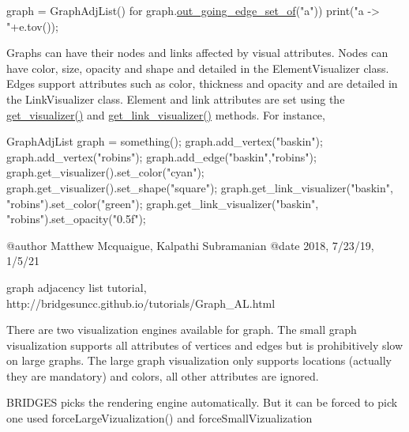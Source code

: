 \begin{DoxyCode}
graph = GraphAdjList()
for graph.\hyperlink{classbridges_1_1graph__adj__list_1_1_graph_adj_list_a6e14580e5fd7712bc8510da921fb97f6}{out\_going\_edge\_set\_of}("a"))
     print("a -> "+e.tov());
\end{DoxyCode}


Graphs can have their nodes and links affected by visual attributes. Nodes can have color, size, opacity and shape and detailed in the Element\+Visualizer class. Edges support attributes such as color, thickness and opacity and are detailed in the Link\+Visualizer class. Element and link attributes are set using the \hyperlink{classbridges_1_1graph__adj__list_1_1_graph_adj_list_ad63fce416ec0fdfd99d05e6236807fd8}{get\+\_\+visualizer()} and \hyperlink{classbridges_1_1graph__adj__list_1_1_graph_adj_list_abaa3015ae78e0f5ebc6fd2d2d2772927}{get\+\_\+link\+\_\+visualizer()} methods. For instance,


\begin{DoxyCode}
GraphAdjList graph = something();
graph.add\_vertex(\textcolor{stringliteral}{"baskin"});
graph.add\_vertex(\textcolor{stringliteral}{"robins"});
graph.add\_edge(\textcolor{stringliteral}{"baskin"},\textcolor{stringliteral}{"robins"});
graph.get\_visualizer().set\_color(\textcolor{stringliteral}{"cyan"});
graph.get\_visualizer().set\_shape(\textcolor{stringliteral}{"square"});
graph.get\_link\_visualizer(\textcolor{stringliteral}{"baskin"}, \textcolor{stringliteral}{"robins"}).set\_color(\textcolor{stringliteral}{"green"});
graph.get\_link\_visualizer(\textcolor{stringliteral}{"baskin"}, \textcolor{stringliteral}{"robins"}).set\_opacity(\textcolor{stringliteral}{"0.5f"});
\end{DoxyCode}


\begin{DoxyVerb}@author Matthew Mcquaigue, Kalpathi Subramanian
@date 2018,  7/23/19, 1/5/21

\sa graph adjacency list tutorial, http://bridgesuncc.github.io/tutorials/Graph_AL.html

There are two visualization engines available for graph. The small
graph visualization supports all attributes of vertices and edges
but is prohibitively slow on large graphs. The large graph
visualization only supports locations (actually they are mandatory)
and colors, all other attributes are ignored.

BRIDGES picks the rendering engine automatically. But it can be
forced to pick one used forceLargeVizualization() and
forceSmallVizualization\end{DoxyVerb}
